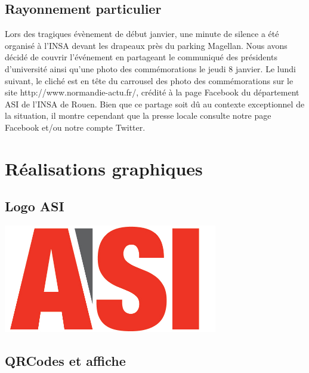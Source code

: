 \subsection{Rayonnement particulier}

Lors des tragiques évènement de début janvier, une minute de silence a été organisé à l'INSA devant les drapeaux près du parking Magellan. Nous avons décidé de couvrir l'événement en partageant le communiqué des présidents d'université ainsi qu'une photo des commémorations le jeudi 8 janvier. 
Le lundi suivant, le cliché est en tête du carrousel des photo des commémorations sur le site http://www.normandie-actu.fr/, crédité à la page Facebook du département ASI de l'INSA de Rouen.
Bien que ce partage soit dû au contexte exceptionnel de la situation, il montre cependant que la presse locale consulte notre page Facebook et/ou notre compte Twitter.

\section{Réalisations graphiques}
\subsection{Logo ASI}

\begin{center}
	\includegraphics[width=0.7\textwidth]{images/logo.jpg}
\end{center}

\subsection{QRCodes et affiche}

